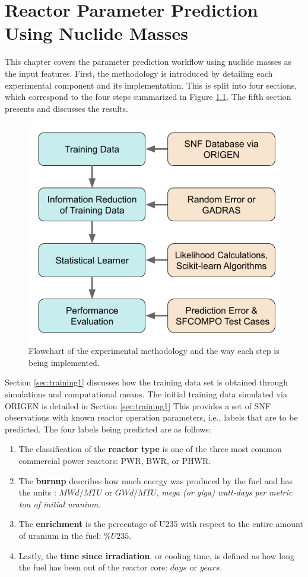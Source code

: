 \chapter{Reactor Parameter Prediction Using Nuclide Masses}
\label{ch:exp1}

This chapter covers the parameter prediction workflow using nuclide masses as
the input features. First, the methodology is introduced by detailing each
experimental component and its implementation.  This is split into four
sections, which correspond to the four steps summarized in Figure
\ref{fig:method}. The fifth section presents and discusses the results.

\begin{figure}[!ht]
  \centering
  \includegraphics[width=0.7\linewidth]{./chapters/exp1/methodology.png}
  \caption{Flowchart of the experimental methodology and the way each step is being implemented.}
  \label{fig:method}
\end{figure}

Section \ref{sec:training1} discusses how the training data set is obtained
through simulations and computational means. The initial training data
simulated via \gls{ORIGEN} is detailed in Section \ref{sec:training1} This
provides a set of \gls{SNF} observations with known reactor operation
parameters, i.e., labels that are to be predicted. The four labels being
predicted are as follows:
\begin{enumerate}
  \item The classification of the \textbf{reactor type} is one of the three
  most common commercial power reactors: \gls{PWR}, \gls{BWR}, or \gls{PHWR}.
  \item The \textbf{burnup} describes how much energy was produced by the fuel
  and has the units : $MWd/MTU$ or $GWd/MTU$, \textit{mega (or giga) watt-days
  per metric ton of initial uranium}.
  \item The \textbf{enrichment} is the percentage of \gls{U235} with respect to
  the entire amount of uranium in the fuel: $\%U235$. 
  \item Lastly, the \textbf{time since irradiation}, or cooling time, is
  defined as how long the fuel has been out of the reactor core: $days$ or
  $years$.
\end{enumerate}

